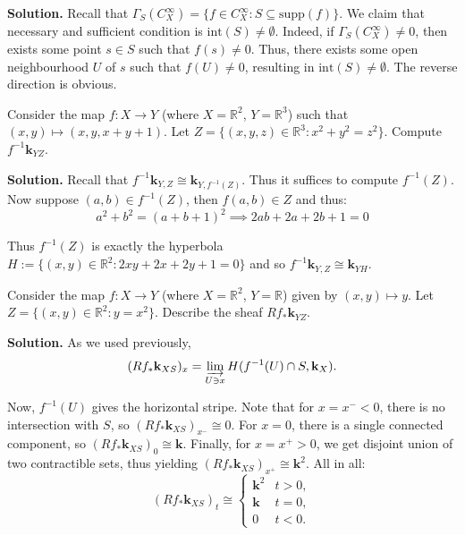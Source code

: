 \documentclass{category-template}
\begin{document}
\textbf{Solution.} Recall that $\Gamma_S(C_X^{\infty}) = \{f \in C_X^{\infty}: S
\subseteq \text{supp}(f)\}$. We claim that necessary and sufficient condition is
$\text{int}(S) \neq \emptyset$. Indeed, if $\Gamma_S(C_X^{\infty}) \neq 0$, then
exists some point $s \in S$ such that $f(s) \neq 0$. Thus, there exists some
open neighbourhood $U$ of $s$ such that $f(U) \neq 0$, resulting in
$\text{int}(S) \neq \emptyset$. The reverse direction is obvious.

\begin{problem}
    Consider the map $f: X \to Y$ (where $X=\mathbb{R}^2$, $Y=\mathbb{R}^3$)
    such that $(x,y) \mapsto (x,y,x+y+1)$. Let $Z=\{(x,y,z) \in \mathbb{R}^3:
    x^2+y^2=z^2\}$. Compute $f^{-1}\mathbf{k}_{YZ}$.
\end{problem}

\textbf{Solution.} Recall that $f^{-1}\mathbf{k}_{Y,Z} \cong
\mathbf{k}_{Y,f^{-1}(Z)}$. Thus it suffices to compute $f^{-1}(Z)$.
Now suppose $(a,b) \in f^{-1}(Z)$, then $f(a,b) \in Z$ and thus:
\begin{equation*}
    a^2 + b^2 = (a+b+1)^2 \implies 2ab+2a+2b+1 = 0
\end{equation*}

Thus $f^{-1}(Z)$ is exactly the hyperbola $H := \{(x,y) \in \mathbb{R}^2:
2xy+2x+2y+1=0\}$ and so $f^{-1}\mathbf{k}_{Y,Z} \cong \mathbf{k}_{YH}$.

\begin{problem}
    Consider the map $f: X \to Y$ (where $X=\mathbb{R}^2$, $Y=\mathbb{R}$)
    given by $(x,y) \mapsto y$. Let $Z=\{(x,y) \in \mathbb{R}^2: y=x^2\}$.
    Describe the sheaf $Rf_*\mathbf{k}_{YZ}$.
\end{problem}

\textbf{Solution.} As we used previously,
\begin{equation*}
    (Rf_*\mathbf{k}_{XS})_x = \varinjlim_{U \ni x} H(f^{-1}(U) \cap S, \mathbf{k}_X).
\end{equation*}

Now, $f^{-1}(U)$ gives the horizontal stripe. Note that for $x=x^{-} < 0$, there
is no intersection with $S$, so $(Rf_*\mathbf{k}_{XS})_{x^{-}} \cong 0$. For
$x=0$, there is a single connected component, so $(Rf_*\mathbf{k}_{XS})_0 \cong
\mathbf{k}$. Finally, for $x=x^+>0$, we get disjoint union of two contractible 
sets, thus yielding $(Rf_*\mathbf{k}_{XS})_{x^+} \cong \mathbf{k}^2$. All in all:
\begin{equation*}
    (Rf_*\mathbf{k}_{XS})_{t} \cong \begin{cases}
        \mathbf{k}^2 & t>0, \\
        \mathbf{k} & t=0, \\
        0 & t<0.
    \end{cases} 
\end{equation*}
\end{document}
